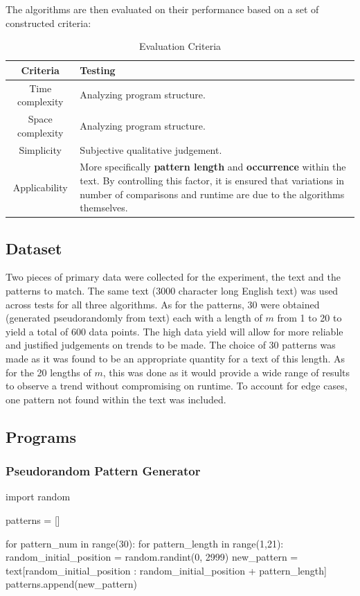 \documentclass[12pt]{article}
\begin{document}
The algorithms are then evaluated on their performance based on a set of constructed criteria:

\begin{table}[!htbp]
    \centering
    \begin{tabular}{|c|p{12cm}|}
        \hline
        \textbf{Criteria} & \textbf{Testing} \\
        \hline
        Time complexity & Analyzing program structure. \\[0.25cm]
        Space complexity & Analyzing program structure. \\[0.25cm]
        Simplicity & Subjective qualitative judgement. \\[0.25cm]
        Applicability & More specifically \textbf{pattern length} and \textbf{occurrence} within the text. By controlling this factor, it is ensured that variations in number of comparisons and runtime are due to the algorithms themselves. \\
        \hline
    \end{tabular}
    \caption{Evaluation Criteria}
\end{table}
\pagebreak
\subsection{Dataset}
Two pieces of primary data were collected for the experiment, the text and the patterns to match. The same text (3000 character long English text) was used across tests for all three algorithms. As for the patterns, 30 were obtained (generated pseudorandomly from text) each with a length of $m$ from 1 to 20 to yield a total of 600 data points. The high data yield will allow for more reliable and justified judgements on trends to be made. The choice of 30 patterns was made as it was found to be an appropriate quantity for a text of this length. As for the 20 lengths of $m$, this was done as it would provide a wide range of results to observe a trend without compromising on runtime. To account for edge cases, one pattern not found within the text was included.

\subsection{Programs}
\subsubsection{Pseudorandom Pattern Generator}

\begin{singlespace}
\begin{python}
import random

patterns = []

for pattern_num in range(30):
	for pattern_length in range(1,21):
		random_initial_position = random.randint(0, 2999)
		new_pattern = text[random_initial_position : random_initial_position + pattern_length]
		patterns.append(new_pattern)
\end{python}
\end{singlespace}
\end{document}
